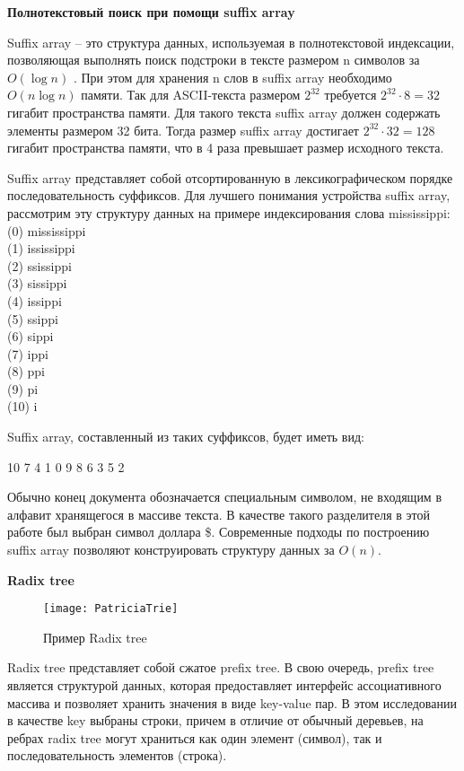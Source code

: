 \textbf{Полнотекстовый поиск при помощи suffix array}

Suffix array -- это структура данных, используемая в полнотекстовой индексации, позволяющая выполнять
поиск подстроки в тексте размером n символов за $O(\log{}n)$ \cite{manber1993suffix}.
При этом для хранения n слов в suffix array необходимо $O(n \log{}n)$ памяти.
Так для ASCII-текста размером $2^{32}$ требуется $2^{32} \cdot 8 = 32$ гигабит пространства памяти.
Для такого текста suffix array должен содержать элементы размером 32 бита.
Тогда размер suffix array достигает $2^{32} \cdot 32 = 128$ гигабит пространства памяти,
что в 4 раза превышает размер исходного текста.

Suffix array представляет собой отсортированную в лексикографическом порядке
последовательность суффиксов. Для лучшего понимания устройства suffix array, рассмотрим эту структуру данных на примере индексирования
слова mississippi:
\\(0) mississippi
\\(1) ississippi
\\(2) ssissippi
\\(3) sissippi
\\(4) issippi
\\(5) ssippi
\\(6) sippi
\\(7) ippi
\\(8) ppi
\\(9) pi
\\(10) i

Suffix array, составленный из таких суффиксов, будет иметь вид:

10 7 4 1 0 9 8 6 3 5 2

Обычно конец документа обозначается специальным символом, не входящим в алфавит хранящегося в массиве текста.
В качестве такого разделителя в этой работе был выбран символ доллара \$.
Современные подходы по построению suffix array позволяют конструировать структуру данных за $O(n)$.

\textbf{Radix tree}


\begin{wrapfigure}{r}{0.25\textwidth} %
 \centering
 \texttt{[image: PatriciaTrie]}
 \caption{Пример Radix tree}
\end{wrapfigure}

Radix tree представляет собой сжатое prefix tree. В свою очередь, prefix tree является
структурой данных, которая предоставляет интерфейс ассоциативного массива и позволяет
хранить значения в виде key-value пар.
В этом исследовании в качестве key выбраны строки, причем в отличие от обычный деревьев,
на ребрах radix tree могут храниться как один элемент (символ),
так и последовательность элементов (строка).

